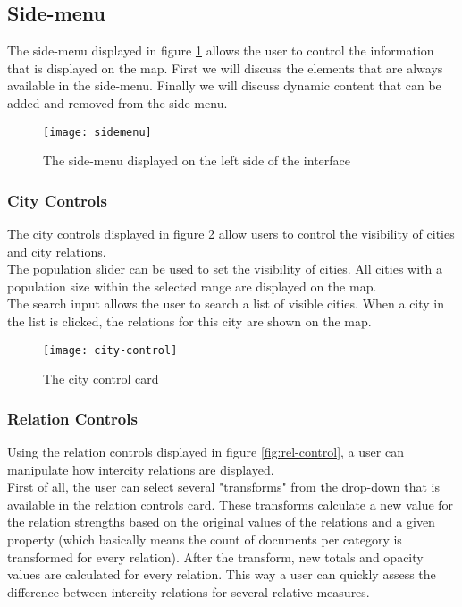 \subsection{Side-menu}
The side-menu displayed in figure \ref{fig:sidemenu} allows the user to control the information that is displayed on the map. First we will discuss the elements that are always available in the side-menu. Finally we will discuss dynamic content that can be added and removed from the side-menu.

\begin{figure}[H]
    \centering
    \texttt{[image: sidemenu]}
    \caption{The side-menu displayed on the left side of the interface}
    \label{fig:sidemenu}
\end{figure}


\subsubsection{City Controls}
The city controls displayed in figure \ref{fig:city-control} allow users to control the visibility of cities and city relations.\\
The population slider can be used to set the visibility of cities. All cities with a population size within the selected range are displayed on the map.\\
The search input allows the user to search a list of visible cities. When a city in the list is clicked, the relations for this city are shown on the map.

\begin{figure}[H]
    \centering
    \texttt{[image: city-control]}
    \caption{The city control card}
    \label{fig:city-control}
\end{figure}

\subsubsection{Relation Controls}
Using the relation controls displayed in figure \ref{fig:rel-control}, a user can manipulate how intercity relations are displayed.\\
First of all, the user can select several "transforms" from the drop-down that is available in the relation controls card. These transforms calculate a new value for the relation strengths based on the original values of the relations and a given property (which basically means the count of documents per category is transformed for every relation). After the transform, new totals and opacity values are calculated for every relation. This way a user can quickly assess the difference between intercity relations for several relative measures.\\

